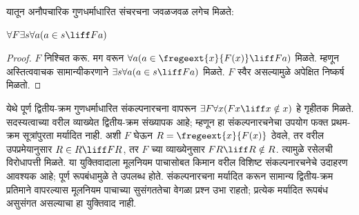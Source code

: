 \documentclass[../../../include/open-logic-section]{subfiles}
\begin{document}
यातून अनौपचारिक गुणधर्माधारित संचरचना जवळजवळ लगेच मिळते:

\begin{lem}
$\forall F \exists s \forall a (a \in s \liff Fa)$
\end{lem}

\begin{proof}
$F$ निश्चित करू. मग  वरून $\forall a (a \in
\fregeext{x}{F(x)} \liff Fa)$ मिळते. म्हणून अस्तित्ववाचक सामान्यीकरणाने $\exists s\forall a(a \in s \liff Fa)$ मिळते. $F$ स्वैर असल्यामुळे अपेक्षित निष्कर्ष मिळतो.
\end{proof}

येथे पूर्ण द्वितीय-क्रम गुणधर्माधारित संकल्पनारचना
वापरून $\exists F\forall x(Fx\liff x\notin x)$ हे गृहीतक मिळते.
सदस्यत्वाच्या वरील व्याख्येत द्वितीय-क्रम संख्यापक आहे;
म्हणून हा संकल्पनारचनेचा उपयोग फक्त प्रथम-क्रम सूत्रांपुरता मर्यादित नाही.
अशी $F$ घेऊन $R=\fregeext{x}{F(x)}$ ठेवले, तर
वरील उपप्रमेयानुसार $R\in R\liff FR$, तर $F$ च्या व्याख्येनुसार
$FR\liff R\notin R$. त्यामुळे रसेलची विरोधापत्ती मिळते.
या युक्तिवादाला मूलनियम पाचासोबत किमान
वरील विशिष्ट संकल्पनारचनेचे उदाहरण आवश्यक आहे;
पूर्ण रूपबंधामुळे ते उपलब्ध होते.
संकल्पनारचना मर्यादित करून सामान्य द्वितीय-क्रम प्रतिमाने वापरल्यास
मूलनियम पाचाच्या सुसंगततेचा वेगळा प्रश्न उभा राहतो;
प्रत्येक मर्यादित रूपबंध असुसंगत असल्याचा हा युक्तिवाद नाही.
\end{document}

